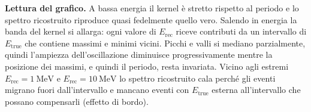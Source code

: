 \documentclass[11pt,a4paper]{article}
\newcommand{\Et}{E_{\mathrm{true}}}
\newcommand{\Er}{E_{\mathrm{rec}}}
\begin{document}
\noindent
\textbf{Lettura del grafico.} A bassa energia il kernel è stretto rispetto al periodo e
lo spettro ricostruito riproduce quasi fedelmente quello vero. Salendo in energia la banda
del kernel si allarga: ogni valore di $\Er$ riceve contributi da un intervallo di $\Et$ che contiene
massimi e minimi vicini. Picchi e valli si mediano parzialmente, quindi l'ampiezza
dell'oscillazione diminuisce progressivamente mentre la posizione dei massimi, e quindi il
periodo, resta invariata. Vicino agli estremi $\Er = 1~\mathrm{MeV}$ e
$\Er = 10~\mathrm{MeV}$ lo spettro ricostruito cala perché gli eventi migrano fuori
dall'intervallo e mancano eventi con $\Et$ esterna all'intervallo che possano compensarli
(effetto di bordo).
\end{document}
